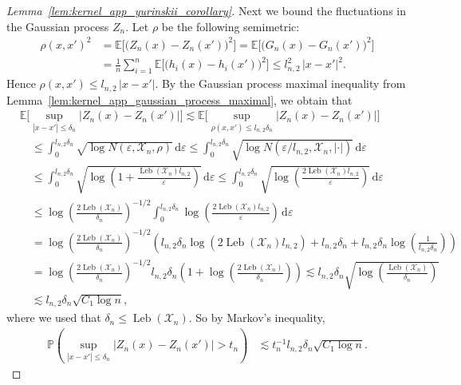 \documentclass[11pt,lof]{puthesis}
\renewcommand{\P}{\ensuremath{\mathbb{P}}}
\newcommand{\E}{\ensuremath{\mathbb{E}}}
\newcommand{\cX}{\ensuremath{\mathcal{X}}}
\DeclareMathOperator{\Leb}{Leb}
\newcommand{\diff}[1]{\,\mathrm{d}#1}
\theoremstyle{break}
\theoremstyle{proof}
\newtheorem{proof}{Proof}
\begin{document}
\begin{proof}[Lemma~\ref{lem:kernel_app_yurinskii_corollary}]
Next we bound the fluctuations in the Gaussian process
$Z_n$.
Let $\rho$ be the following semimetric:
%
\begin{align*}
\rho(x, x')^2
&=
\E\big[\big( Z_n(x) - Z_n(x') \big)^2\big]
=
\E\big[\big( G_n(x) - G_n(x') \big)^2\big] \\
&=
\frac{1}{n}
\sum_{i=1}^n
\E\big[\big( h_i(x) - h_i(x') \big)^2\big]
\leq
l_{n,2}^2 \, |x - x'|^2.
\end{align*}
%
Hence
$\rho(x, x')
\leq
l_{n,2} \, |x - x'|$.
By
the Gaussian process maximal inequality from
Lemma~\ref{lem:kernel_app_gaussian_process_maximal},
we obtain that
%
\begin{align*}
&\E\bigg[
\sup_{|x - x'| \leq \delta_n}
\big|
Z_n(x) - Z_n(x')
\big|
\bigg]
\lesssim
\E\bigg[
\sup_{\rho(x,x') \leq l_{n,2} \delta_n}
\big|
Z_n(x) - Z_n(x')
\big|
\bigg] \\
&\quad\leq
\int_0^{l_{n,2} \delta_n}
\sqrt{\log N(\varepsilon, \cX_n, \rho)}
\diff{\varepsilon}
\leq
\int_0^{l_{n,2} \delta_n}
\sqrt{\log N(\varepsilon / l_{n,2}, \cX_n, |\cdot|)}
\diff{\varepsilon} \\
&\quad\leq
\int_0^{l_{n,2} \delta_n}
\sqrt{\log \left( 1 + \frac{\Leb(\cX_n) l_{n,2}}{\varepsilon} \right)}
\diff{\varepsilon}
\leq
\int_0^{l_{n,2} \delta_n}
\sqrt{\log \left( \frac{2\Leb(\cX_n) l_{n,2}}{\varepsilon} \right)}
\diff{\varepsilon} \\
&\quad\leq
\log \left(\frac{2\Leb(\cX_n)}{\delta_n} \right)^{-1/2}
\int_0^{l_{n,2} \delta_n}
\log \left( \frac{2\Leb(\cX_n) l_{n,2}}{\varepsilon} \right)
\diff{\varepsilon} \\
&\quad=
\log \left(\frac{2\Leb(\cX_n)}{\delta_n} \right)^{-1/2}
\left(
l_{n,2} \delta_n \log \left( 2 \Leb(\cX_n) l_{n,2} \right)
+ l_{n,2} \delta_n
+ l_{n,2} \delta_n \log \left( \frac{1}{l_{n,2} \delta_n} \right)
\right) \\
&\quad=
\log \left(\frac{2\Leb(\cX_n)}{\delta_n} \right)^{-1/2}
l_{n,2} \delta_n
\left(
1 +
\log \left( \frac{2\Leb(\cX_n)}{\delta_n} \right)
\right)
\lesssim
l_{n,2} \delta_n
\sqrt{\log \left( \frac{\Leb(\cX_n)}{\delta_n} \right)} \\
&\quad\lesssim
l_{n,2} \delta_n
\sqrt{C_1 \log n},
\end{align*}
%
where we used that $\delta_n \leq \Leb(\cX_n)$.
So by Markov's inequality,
%
\begin{align*}
\P\left(
\sup_{|x - x'| \leq \delta_n}
\big|
Z_n(x) - Z_n(x')
\big|
> t_n
\right)
&\lesssim
t_n^{-1}
l_{n,2} \delta_n
\sqrt{C_1 \log n}.
\end{align*}


\end{proof}
\end{document}
